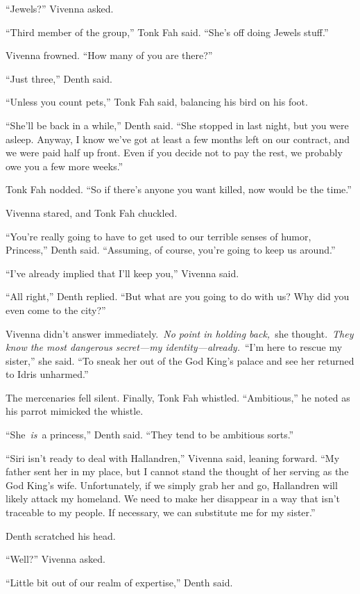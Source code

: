 “Jewels?” Vivenna asked.

“Third member of the group,” Tonk Fah said. “She’s off doing Jewels stuff.”

Vivenna frowned. “How many of you are there?”

“Just three,” Denth said.

“Unless you count pets,” Tonk Fah said, balancing his bird on his foot.

“She’ll be back in a while,” Denth said. “She stopped in last night, but you were asleep. Anyway, I know we’ve got at least a few months left on our contract, and we were paid half up front. Even if you decide not to pay the rest, we probably owe you a few more weeks.”

Tonk Fah nodded. “So if there’s anyone you want killed, now would be the time.”

Vivenna stared, and Tonk Fah chuckled.

“You’re really going to have to get used to our terrible senses of humor, Princess,” Denth said. “Assuming, of course, you’re going to keep us around.”

“I’ve already implied that I’ll keep you,” Vivenna said.

“All right,” Denth replied. “But what are you going to do with us? Why did you even come to the city?”

Vivenna didn’t answer immediately.~\textit{No point in holding back,}~she thought.~\textit{They know the most dangerous secret—my identity—already.}~“I’m here to rescue my sister,” she said. “To sneak her out of the God King’s palace and see her returned to Idris unharmed.”

The mercenaries fell silent. Finally, Tonk Fah whistled. “Ambitious,” he noted as his parrot mimicked the whistle.

“She~\textit{is}~a princess,” Denth said. “They tend to be ambitious sorts.”

“Siri isn’t ready to deal with Hallandren,” Vivenna said, leaning forward. “My father sent her in my place, but I cannot stand the thought of her serving as the God King’s wife. Unfortunately, if we simply grab her and go, Hallandren will likely attack my homeland. We need to make her disappear in a way that isn’t traceable to my people. If necessary, we can substitute me for my sister.”

Denth scratched his head.

“Well?” Vivenna asked.

“Little bit out of our realm of expertise,” Denth said.

